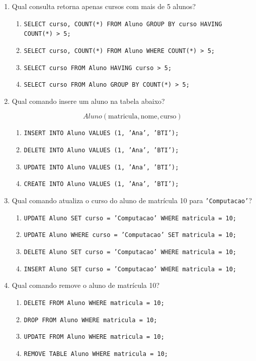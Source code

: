 \documentclass[12pt,a4paper]{article}
\begin{document}
\begin{enumerate}[resume,label=\textbf{Q\arabic*.}]
\item Qual consulta retorna apenas cursos com mais de 5 alunos?

\begin{enumerate}[label=\alph*)]
    \item \texttt{SELECT curso, COUNT(*) FROM Aluno GROUP BY curso HAVING COUNT(*) > 5;}
    \item \texttt{SELECT curso, COUNT(*) FROM Aluno WHERE COUNT(*) > 5;}
    \item \texttt{SELECT curso FROM Aluno HAVING curso > 5;}
    \item \texttt{SELECT curso FROM Aluno GROUP BY COUNT(*) > 5;}
\end{enumerate}

\item Qual comando insere um aluno na tabela abaixo?

\[
Aluno(\text{matricula}, \text{nome}, \text{curso})
\]

\begin{enumerate}[label=\alph*)]
    \item \texttt{INSERT INTO Aluno VALUES (1, 'Ana', 'BTI');}
    \item \texttt{DELETE INTO Aluno VALUES (1, 'Ana', 'BTI');}
    \item \texttt{UPDATE INTO Aluno VALUES (1, 'Ana', 'BTI');}
    \item \texttt{CREATE INTO Aluno VALUES (1, 'Ana', 'BTI');}
\end{enumerate}

\item Qual comando atualiza o curso do aluno de matrícula 10 para \texttt{'Computacao'}?

\begin{enumerate}[label=\alph*)]
    \item \texttt{UPDATE Aluno SET curso = 'Computacao' WHERE matricula = 10;}
    \item \texttt{UPDATE Aluno WHERE curso = 'Computacao' SET matricula = 10;}
    \item \texttt{DELETE Aluno SET curso = 'Computacao' WHERE matricula = 10;}
    \item \texttt{INSERT Aluno SET curso = 'Computacao' WHERE matricula = 10;}
\end{enumerate}

\item Qual comando remove o aluno de matrícula 10?

\begin{enumerate}[label=\alph*)]
    \item \texttt{DELETE FROM Aluno WHERE matricula = 10;}
    \item \texttt{DROP FROM Aluno WHERE matricula = 10;}
    \item \texttt{UPDATE FROM Aluno WHERE matricula = 10;}
    \item \texttt{REMOVE TABLE Aluno WHERE matricula = 10;}
\end{enumerate}


\end{enumerate}
\end{document}
